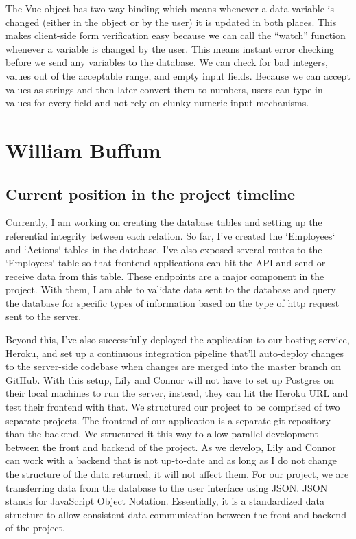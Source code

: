 \documentclass[draftclsnofoot,onecolumn,letterpaper,10pt,compsoc]{IEEEtran}
\begin{document}
The Vue object has two-way-binding which means whenever a data variable is changed (either in the object or by the user) it is updated in both places. This makes client-side form verification easy because we can call the “watch” function whenever a variable is changed by the user. This means instant error checking before we send any variables to the database. We can check for bad integers, values out of the acceptable range, and empty input fields. Because we can accept values as strings and then later convert them to numbers, users can type in values for every field and not rely on clunky numeric input mechanisms.

\section{William Buffum}

\subsection{Current position in the project timeline}
Currently, I am working on creating the database tables and setting up the referential integrity between each relation.
So far, I’ve created the `Employees` and `Actions` tables in the database.
I’ve also exposed several routes to the `Employees` table so that frontend applications can hit the API and send or receive data from this table.
These endpoints are a major component in the project.
With them, I am able to validate data sent to the database and query the database for specific types of information based on the type of http request sent to the server.

Beyond this, I’ve also successfully deployed the application to our hosting service, Heroku, and set up a continuous integration pipeline that’ll auto-deploy changes to the server-side codebase when changes are merged into the master branch on GitHub.
With this setup, Lily and Connor will not have to set up Postgres on their local machines to run the server, instead, they can hit the Heroku URL and test their frontend with that.
We structured our project to be comprised of two separate projects.
The frontend of our application is a separate git repository than the backend.
We structured it this way to allow parallel development between the front and backend of the project.
As we develop, Lily and Connor can work with a backend that is not up-to-date and as long as I do not change the structure of the data returned, it will not affect them.
For our project, we are transferring data from the database to the user interface using JSON.
JSON stands for JavaScript Object Notation.
Essentially, it is a standardized data structure to allow consistent data communication between the front and backend of the project.
\end{document}
